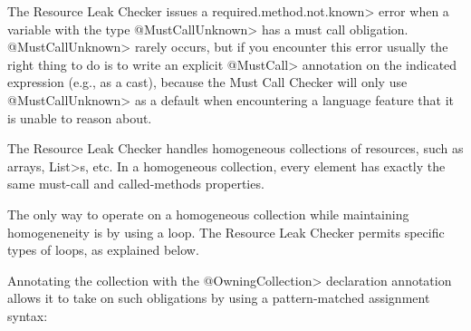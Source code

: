 The Resource Leak Checker issues a \<required.method.not.known> error
when a variable with the type \<@MustCallUnknown> has a must call obligation.
\<@MustCallUnknown> rarely occurs, but if you encounter this error usually
the right thing to do is to write an explicit \<@MustCall> annotation
on the indicated expression (e.g., as a cast), because the Must Call Checker
will only use \<@MustCallUnknown> as a default when encountering a language
feature that it is unable to reason about.



The Resource Leak Checker handles homogeneous collections of resources,
such as arrays, \<List>s, etc.  In a homogeneous collection, every element
has exactly the same must-call and called-methods properties.

The only way to operate on a homogeneous collection while maintaining
homogeneneity is by using a loop.  The Resource Leak Checker permits
specific types of loops, as explained below.



Annotating the collection with the \<@OwningCollection> declaration annotation allows it to take on such obligations by using a pattern-matched assignment syntax:

